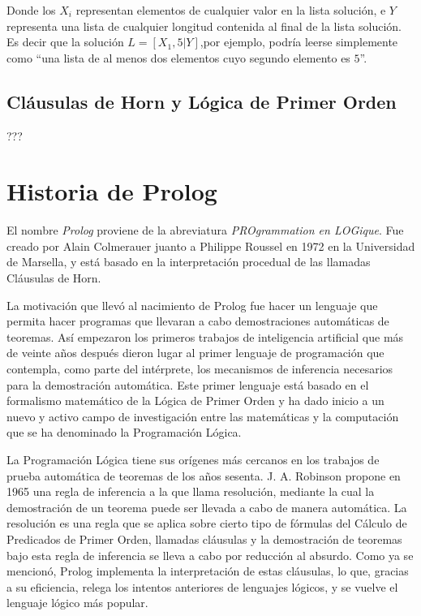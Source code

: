 \documentclass{article}
\begin{document}
Donde los $X_i$ representan elementos de cualquier valor en la lista solución, e $Y$ representa una lista de cualquier longitud contenida al final de la lista solución. Es decir que la solución $L=[X_1,5|Y]$,por ejemplo, podría leerse simplemente como ``una lista de al menos dos elementos cuyo segundo elemento es $5$''.

\subsection{Cláusulas de Horn y Lógica de Primer Orden}
???

\newpage
\section{Historia de Prolog}

El nombre \textit{Prolog} proviene de la abreviatura \textit{PROgrammation en LOGique}. Fue creado por Alain Colmerauer juanto a Philippe Roussel en 1972 en la Universidad de Marsella, y está basado en la interpretación procedual de las llamadas Cláusulas de Horn.

La motivación que llevó al nacimiento de Prolog fue hacer un lenguaje que permita hacer programas que llevaran a cabo demostraciones automáticas de teoremas. Así empezaron los primeros trabajos de inteligencia artificial que más de veinte años después dieron lugar al primer lenguaje de programación que contempla, como parte del intérprete, los mecanismos de inferencia necesarios para la demostración automática. Este primer lenguaje está basado en el formalismo matemático de la Lógica de Primer Orden y ha dado inicio a un nuevo y activo campo de investigación entre las matemáticas y la computación que se ha denominado la Programación Lógica.

La Programación Lógica tiene sus orígenes más cercanos en los trabajos de prueba automática de teoremas de los años sesenta. J. A. Robinson propone en 1965 una regla de inferencia a la que llama resolución, mediante la cual la demostración de un teorema puede ser llevada a cabo de manera automática. La resolución es una regla que se aplica sobre cierto tipo de fórmulas del Cálculo de Predicados de Primer Orden, llamadas cláusulas y la demostración de teoremas bajo esta regla de inferencia se lleva a cabo por reducción al absurdo. Como ya se mencionó, Prolog implementa la interpretación de estas cláusulas, lo que, gracias a su eficiencia, relega los intentos anteriores de lenguajes lógicos, y se vuelve el lenguaje lógico más popular.
\end{document}
